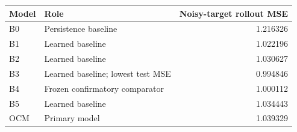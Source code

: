 \begin{tabular}{llr}
\toprule
Model & Role & Noisy-target rollout MSE \\
\midrule
B0 & Persistence baseline & 1.216326 \\
B1 & Learned baseline & 1.022196 \\
B2 & Learned baseline & 1.030627 \\
B3 & Learned baseline; lowest test MSE & 0.994846 \\
B4 & Frozen confirmatory comparator & 1.000112 \\
B5 & Learned baseline & 1.034443 \\
OCM & Primary model & 1.039329 \\
\bottomrule
\end{tabular}
